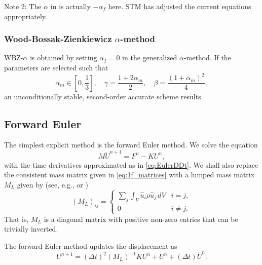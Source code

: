 \documentclass[12pt]{article}
\newcommand{\inverse}[1]{\ensuremath{{#1}^{-1}}} %
\begin{document}
Note 2:  The $\alpha$ in \cite{Hughes2012} is actually $-\alpha_f$ here.  STM has
adjusted the current equations appropriately.

\subsubsection{Wood-Bossak-Zienkiewicz $\alpha$-method}

WBZ-$\alpha$ is obtained by setting $\alpha_f=0$ in the 
generalized $\alpha$-method.
If the parameters are selected such that \cite{Hughes2012}
\begin{equation}
\alpha_m \in \left[0,\frac{1}{3}\right], \quad \gamma = \frac{1+2\alpha_m}{2}, 
\quad \beta = \frac{(1+\alpha_m)^2}{4},
\end{equation}
an unconditionally stable, second-order accurate scheme results.


\subsection{Forward Euler}

The simplest explicit method is the forward Euler method.
We solve the equation
\begin{equation}
M\ddot{U}^{n+1} = F^n - KU^n,
\end{equation}
with the time derivatives approximated as in \eqref{eq:EulerDDt}.
We shall also replace the consistent mass matrix given in \eqref{eq:1f_matrices}
with a lumped mass matrix $M_L$ given by (see, e.g., \cite{Hughes2012} or \cite{Cook2001})
\begin{equation}
(M_L)_{ij} =
\begin{cases}
   \sum_j \int_V \hat{u}_i \rho \hat{u}_j \, dV   & i = j, \\
   0   & i \ne j.
\end{cases}
\end{equation}
That is, $M_L$ is a diagonal matrix with positive non-zero entries
that can be trivially inverted.

The forward Euler method updates the displacement as
\begin{equation}
\label{eq:ForwardEuler}
U^{n+1} = (\Delta t)^2 \inverse{(M_L)}K U^n + U^n + (\Delta t)\dot{U}^n.
\end{equation}
\end{document}
